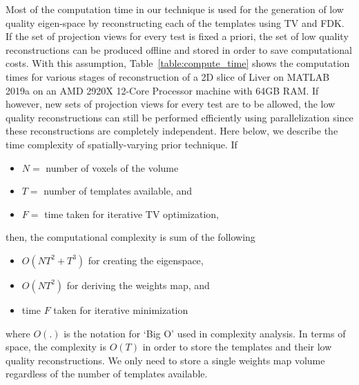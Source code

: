 \documentclass{article}
\begin{document}
\begin{itemize}
\begin{itemize}
  
Most of the
computation time in our technique is used for the generation of low quality eigen-space
by reconstructing each of the templates using TV and FDK. If the set of projection views for every test is fixed a priori, the set of low quality reconstructions can be produced offline and stored in order to save computational costs. With this assumption, Table~\ref{table:compute_time} shows the computation times for various stages of reconstruction of a 2D slice of Liver on MATLAB 2019a on an  AMD 2920X 12-Core Processor machine with 64GB RAM. If however, new sets of projection views for every test are to be allowed, the low quality reconstructions can still be performed efficiently using parallelization since these reconstructions are completely independent. Here below, we describe the
time complexity of spatially-varying prior technique.  If
\begin{itemize}
\item $N =$ number of voxels of the volume
\item $T =$ number of templates available, and
\item $F =$ time taken for iterative TV optimization,
\end{itemize}
then, the computational complexity is sum of the following
\begin{itemize}
\item $O(NT^2+T^3)$ for creating the eigenspace,
\item $O(NT^2)$ for deriving the weights map, and
\item time $F$  taken for iterative minimization
\end{itemize}
where $O(.)$ is the notation for `Big O' used in complexity analysis. 
In terms of space, the complexity is $O(T)$ in order to store the templates and their low quality reconstructions. We only need to store a single weights map volume regardless of the number of templates available.


\end{itemize}
\end{itemize}
\end{document}
